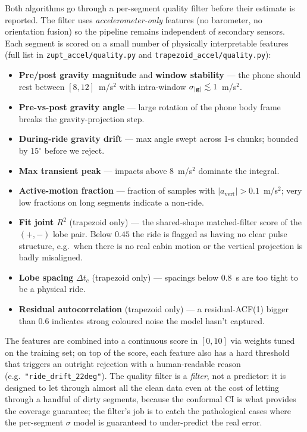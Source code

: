 Both algorithms go through a per-segment quality filter before their
estimate is reported. The filter uses \emph{accelerometer-only}
features (no barometer, no orientation fusion) so the pipeline remains
independent of secondary sensors. Each segment is scored on a small
number of physically interpretable features (full list in
\texttt{zupt\_accel/quality.py} and \texttt{trapezoid\_accel/quality.py}):
\begin{itemize}
  \item \textbf{Pre/post gravity magnitude} and \textbf{window
        stability} — the phone should rest between $[8,12]$~m/s$^2$
        with intra-window $\sigma_{|{\bf g}|}\lesssim 1$~m/s$^2$.
  \item \textbf{Pre-vs-post gravity angle} — large rotation of the
        phone body frame breaks the gravity-projection step.
  \item \textbf{During-ride gravity drift} — max angle swept across
        1-s chunks; bounded by $15^\circ$ before we reject.
  \item \textbf{Max transient peak} — impacts above $8$~m/s$^2$
        dominate the integral.
  \item \textbf{Active-motion fraction} — fraction of samples with
        $|a_\mathrm{vert}|>0.1$~m/s$^2$; very low fractions on long
        segments indicate a non-ride.
  \item \textbf{Fit joint $R^2$} (trapezoid only) — the
        shared-shape matched-filter score of the $(+,-)$ lobe pair.
        Below $0.45$ the ride is flagged as having no clear pulse
        structure, e.g.\ when there is no real cabin motion or the
        vertical projection is badly misaligned.
  \item \textbf{Lobe spacing} $\Delta t_c$ (trapezoid only) —
        spacings below $0.8$~s are too tight to be a physical ride.
  \item \textbf{Residual autocorrelation} (trapezoid only) — a
        residual-ACF(1) bigger than $0.6$ indicates strong coloured
        noise the model hasn't captured.
\end{itemize}
The features are combined into a continuous score in $[0,10]$ via
weights tuned on the training set; on top of the score, each feature
also has a hard threshold that triggers an outright rejection with a
human-readable reason (e.g.\ \texttt{"ride\_drift\_22deg"}). The
quality filter is a \emph{filter}, not a predictor: it is designed to
let through almost all the clean data even at the cost of letting
through a handful of dirty segments, because the conformal CI is what
provides the coverage guarantee; the filter's job is to catch the
pathological cases where the per-segment $\sigma$ model is guaranteed
to under-predict the real error.

